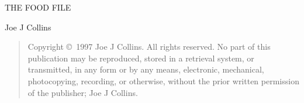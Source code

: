 \documentclass{cookbook}
\begin{document}
\thispagestyle{empty}
\begin{center}
\Huge THE FOOD FILE
\end{center}
\vfill
\begin{center}
Joe J Collins
\end{center}
\clearpage
\strut %
\vfill
\begin{quotation}
\begin{rmfamily}
Copyright \copyright\ 1997 Joe J Collins.
All rights reserved.
No part of this publication may be reproduced,
stored in a retrieval system,
or transmitted,
in any form or by any means,
electronic,
mechanical,
photocopying,
recording,
or otherwise,
without the prior written permission
of the publisher;
Joe J Collins.
\end{rmfamily}
\end{quotation}
\clearpage
{}



\printindex
\end{document}
